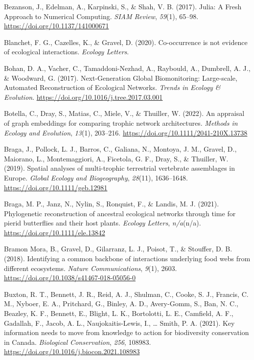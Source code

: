 \documentclass[11pt]{article}
\newlength{\cslhangindent}
\newenvironment{CSLReferences}[2] %
 {%
  \setlength{\parindent}{0pt}
  \ifodd #1 \everypar{\setlength{\hangindent}{\cslhangindent}}\ignorespaces\fi
  \ifnum #2 > 0
  \setlength{\parskip}{#2\baselineskip}
  \fi
 }%
 {}
\begin{document}
\begin{CSLReferences}{1}{0}
\leavevmode{}%
Bezanson, J., Edelman, A., Karpinski, S., \& Shah, V. B. (2017). Julia:
A Fresh Approach to Numerical Computing. \emph{SIAM Review},
\emph{59}(1), 65--98. \url{https://doi.org/10.1137/141000671}

\leavevmode{}%
Blanchet, F. G., Cazelles, K., \& Gravel, D. (2020). Co-occurrence is
not evidence of ecological interactions. \emph{Ecology Letters}.

\leavevmode{}%
Bohan, D. A., Vacher, C., Tamaddoni-Nezhad, A., Raybould, A., Dumbrell,
A. J., \& Woodward, G. (2017). Next-Generation Global Biomonitoring:
Large-scale, Automated Reconstruction of Ecological Networks.
\emph{Trends in Ecology \& Evolution}.
\url{https://doi.org/10.1016/j.tree.2017.03.001}

\leavevmode{}%
Botella, C., Dray, S., Matias, C., Miele, V., \& Thuiller, W. (2022). An
appraisal of graph embeddings for comparing trophic network
architectures. \emph{Methods in Ecology and Evolution}, \emph{13}(1),
203--216. \url{https://doi.org/10.1111/2041-210X.13738}

\leavevmode{}%
Braga, J., Pollock, L. J., Barros, C., Galiana, N., Montoya, J. M.,
Gravel, D., Maiorano, L., Montemaggiori, A., Ficetola, G. F., Dray, S.,
\& Thuiller, W. (2019). Spatial analyses of multi-trophic terrestrial
vertebrate assemblages in Europe. \emph{Global Ecology and
Biogeography}, \emph{28}(11), 1636--1648.
\url{https://doi.org/10.1111/geb.12981}

\leavevmode{}%
Braga, M. P., Janz, N., Nylin, S., Ronquist, F., \& Landis, M. J.
(2021). Phylogenetic reconstruction of ancestral ecological networks
through time for pierid butterflies and their host plants. \emph{Ecology
Letters}, \emph{n/a}(n/a). \url{https://doi.org/10.1111/ele.13842}

\leavevmode{}%
Bramon Mora, B., Gravel, D., Gilarranz, L. J., Poisot, T., \& Stouffer,
D. B. (2018). Identifying a common backbone of interactions underlying
food webs from different ecosystems. \emph{Nature Communications},
\emph{9}(1), 2603. \url{https://doi.org/10.1038/s41467-018-05056-0}

\leavevmode{}%
Buxton, R. T., Bennett, J. R., Reid, A. J., Shulman, C., Cooke, S. J.,
Francis, C. M., Nyboer, E. A., Pritchard, G., Binley, A. D., Avery-Gomm,
S., Ban, N. C., Beazley, K. F., Bennett, E., Blight, L. K., Bortolotti,
L. E., Camfield, A. F., Gadallah, F., Jacob, A. L., Naujokaitis-Lewis,
I., \ldots{} Smith, P. A. (2021). Key information needs to move from
knowledge to action for biodiversity conservation in Canada.
\emph{Biological Conservation}, \emph{256}, 108983.
\url{https://doi.org/10.1016/j.biocon.2021.108983}


\end{CSLReferences}
\end{document}

